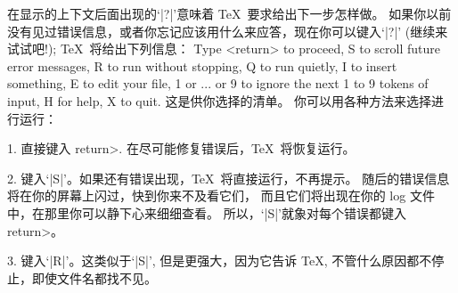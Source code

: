在显示的上下文后面出现的`|?|'意味着 \TeX\ 要求给出下一步怎样做。%
如果你以前没有见过错误信息，或者你忘记应该用什么来应答，现在你可以键入`|?|'%
(继续来试试吧!);
\TeX\ 将给出下列信息：
\begintt
Type <return> to proceed, S to scroll future error messages,
R to run without stopping, Q to run quietly,
I to insert something, E to edit your file,
1 or ... or 9 to ignore the next 1 to 9 tokens of input,
H for help, X to quit.
\endtt
这是供你选择的清单。%
你可以用各种方法来选择进行运行：

\smallskip\item{1.}
直接键入 \<return>. 在尽可能修复错误后，\TeX\ 将恢复运行。

\smallbreak\item{2.} 键入`|S|'。如果还有错误出现，\TeX\ 将直接运行，不再提示。%
随后的错误信息将在你的屏幕上闪过，快到你来不及看它们，
而且它们将出现在你的 log 文件中，在那里你可以静下心来细细查看。%
所以，`|S|'就象对每个错误都键入 \<return>。

\smallbreak\item{3.} 键入`|R|'。这类似于`|S|', 但是更强大，因为它告诉 \TeX,
不管什么原因都不停止，即使文件名都找不见。

